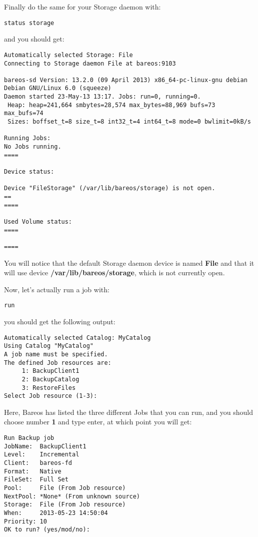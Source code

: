 Finally do the same for your Storage daemon with:

\footnotesize
\begin{verbatim}
status storage
\end{verbatim}
\normalsize

and you should get:

\footnotesize
\begin{verbatim}
Automatically selected Storage: File
Connecting to Storage daemon File at bareos:9103

bareos-sd Version: 13.2.0 (09 April 2013) x86_64-pc-linux-gnu debian Debian GNU/Linux 6.0 (squeeze)
Daemon started 23-May-13 13:17. Jobs: run=0, running=0.
 Heap: heap=241,664 smbytes=28,574 max_bytes=88,969 bufs=73 max_bufs=74
 Sizes: boffset_t=8 size_t=8 int32_t=4 int64_t=8 mode=0 bwlimit=0kB/s

Running Jobs:
No Jobs running.
====

Device status:

Device "FileStorage" (/var/lib/bareos/storage) is not open.
==
====

Used Volume status:
====

====

\end{verbatim}
\normalsize

You will notice that the default Storage daemon device is named {\bf File} and
that it will use device {\bf /var/lib/bareos/storage}, which is not currently open.

Now, let's actually run a job with:

\footnotesize
\begin{verbatim}
run
\end{verbatim}
\normalsize

you should get the following output:

\footnotesize
\begin{verbatim}
Automatically selected Catalog: MyCatalog
Using Catalog "MyCatalog"
A job name must be specified.
The defined Job resources are:
     1: BackupClient1
     2: BackupCatalog
     3: RestoreFiles
Select Job resource (1-3):
\end{verbatim}
\normalsize

Here, Bareos has listed the three different Jobs that you can run, and you
should choose number {\bf 1} and type enter, at which point you will get:

\footnotesize
\begin{verbatim}
Run Backup job
JobName:  BackupClient1
Level:    Incremental
Client:   bareos-fd
Format:   Native
FileSet:  Full Set
Pool:     File (From Job resource)
NextPool: *None* (From unknown source)
Storage:  File (From Job resource)
When:     2013-05-23 14:50:04
Priority: 10
OK to run? (yes/mod/no):
\end{verbatim}
\normalsize

